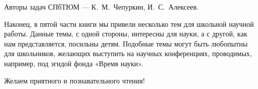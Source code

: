 \aabz Авторы задач СПбТЮМ — К.~М.~Чепуркин, И.~С.~Алексеев.

\thispagestyle{empty}

\aabz Наконец, в пятой части книги мы привели несколько тем для школьной научной работы. Данные темы, с одной стороны, интересны для науки, а с другой, как нам представляется, посильны детям. Подобные темы могут быть любопытны для школьников, желающих выступить на научных конференциях, проводимых, например, под эгидой фонда «Время науки».

\aabz Желаем приятного и познавательного чтения!

